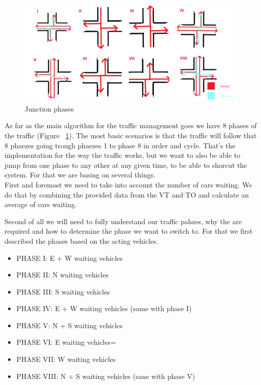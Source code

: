 \documentclass[17pt]{report}
\begin{document}
\begin{figure}[h!]
    \includegraphics[width=\textwidth]{Sketches/AvailableJunctionphases.png}
    \caption{Junction phases}
    \label{fig:Junction_phases}
\end{figure}

As far as the main algorithm for the traffic management goes we have 8 phases of
the traffic (Figure ~\ref{fig:Junction_phases}). The most basic scenarios is that the 
traffic will follow that 8 phaezes going trough phaezes 1 to phase 8 in order and cycle. That's
the implementation for the way the traffic works, but we want to also be
able to jump from one phase to any other at any given time, to be able to shorcut
the system. For that we are basing on several things.\\

\indent \indent
First and foremost we need to take into 
account the number of cars waiting. We do that by combining the provided data from the 
VT and TO and calculate an average of cars waiting.

\indent \indent
Second of all we will need to fully understand our traffic pahzes, why the are required
and how to determine the phase we want to switch to. For that we first described the 
phases based on the acting vehicles.\\
\begin{itemize}
    \item PHASE I: E + W waiting vehicles
    \item PHASE II: N waiting vehicles
    \item PHASE III: S waiting vehicles
    \item PHASE IV: E + W waiting vehicles (same with phase I)
    \item PHASE V: N + S waiting vehicles
    \item PHASE VI: E waiting vehicles=
    \item PHASE VII: W waiting vehicles
    \item PHASE VIII: N + S waiting vehicles (sane with phase V)
\end{itemize}
\end{document}

